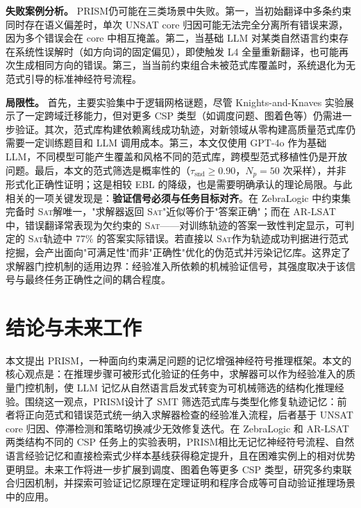 \documentclass[UTF8,a4paper,12pt]{ctexart}
\newcommand{\PRISM}{PRISM}
\newcommand{\sat}{\textsc{Sat}}
\begin{document}
\textbf{失败案例分析。}
\PRISM 仍可能在三类场景中失败。第一，当初始翻译中多条约束同时存在语义偏差时，单次 UNSAT core 归因可能无法完全分离所有错误来源，因为多个错误会在 core 中相互掩盖。第二，当基础 LLM 对某类自然语言约束存在系统性误解时（如方向词的固定偏见），即使触发 L4 全量重新翻译，也可能再次生成相同方向的错误。第三，当当前约束组合未被范式库覆盖时，系统退化为无范式引导的标准神经符号流程。

\textbf{局限性。}
首先，主要实验集中于逻辑网格谜题，尽管 Knights-and-Knaves 实验展示了一定跨域迁移能力，但对更多 CSP 类型（如调度问题、图着色等）仍需进一步验证。其次，范式库构建依赖离线成功轨迹，对新领域从零构建高质量范式库仍需要一定训练题目和 LLM 调用成本。第三，本文仅使用 GPT-4o 作为基础 LLM，不同模型可能产生覆盖和风格不同的范式库，跨模型范式移植性仍是开放问题。最后，本文的范式筛选是概率性的（\(\tau_{\text{snd}}\geq0.90\)，\(N_p=50\) 次采样），并非形式化正确性证明；这是相较 EBL 的降级，也是需要明确承认的理论局限。与此相关的一项关键发现是：\textbf{验证信号必须与任务目标对齐}。在 ZebraLogic 中约束集完备时 \sat 解唯一，"求解器返回 \sat"近似等价于"答案正确"；而在 AR-LSAT 中，错误翻译常表现为欠约束的 \sat——对训练轨迹的答案一致性判定显示，可判定的 \sat 轨迹中 77\% 的答案实际错误。若直接以 \sat 作为轨迹成功判据进行范式挖掘，会产出面向"可满足性"而非"正确性"优化的伪范式并污染记忆库。这界定了求解器门控机制的适用边界：经验准入所依赖的机械验证信号，其强度取决于该信号与最终任务正确性之间的耦合程度。

\section{结论与未来工作}

本文提出 \PRISM，一种面向约束满足问题的记忆增强神经符号推理框架。本文的核心观点是：在推理步骤可被形式化验证的任务中，求解器可以作为经验准入的质量门控机制，使 LLM 记忆从自然语言启发式转变为可机械筛选的结构化推理经验。围绕这一观点，\PRISM 设计了 SMT 筛选范式库与类型化修复轨迹记忆：前者将正向范式和错误范式统一纳入求解器检查的经验准入流程，后者基于 UNSAT core 归因、停滞检测和策略切换减少无效修复迭代。在 ZebraLogic 和 AR-LSAT 两类结构不同的 CSP 任务上的实验表明，\PRISM 相比无记忆神经符号流程、自然语言经验记忆和直接检索式少样本基线获得稳定提升，且在困难实例上的相对优势更明显。未来工作将进一步扩展到调度、图着色等更多 CSP 类型，研究多约束联合归因机制，并探索可验证记忆原理在定理证明和程序合成等可自动验证推理场景中的应用。

\renewcommand{\refname}{参考文献}
\end{document}
